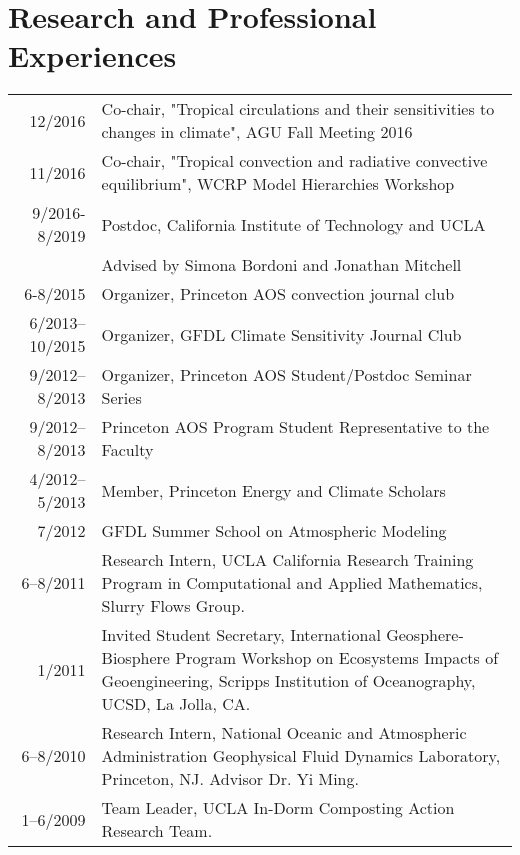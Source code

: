 \documentclass{article}
\begin{document}
\section*{Research and Professional Experiences}
\label{sec:orgheadline13}
\begin{center}
\begin{tabularx}{\textwidth}{rX}
12/2016 & Co-chair, "Tropical circulations and their sensitivities to changes in climate", AGU Fall Meeting 2016\\
11/2016 & Co-chair, "Tropical convection and radiative convective equilibrium", WCRP Model Hierarchies Workshop\\
9/2016-8/2019 & Postdoc, California Institute of Technology and UCLA\\
 & Advised by Simona Bordoni and Jonathan Mitchell\\
6-8/2015 & Organizer, Princeton AOS convection journal club\\
6/2013–10/2015 & Organizer, GFDL Climate Sensitivity Journal Club\\
9/2012–8/2013 & Organizer, Princeton AOS Student/Postdoc Seminar Series\\
9/2012–8/2013 & Princeton AOS Program Student Representative to the Faculty\\
4/2012–5/2013 & Member, Princeton Energy and Climate Scholars\\
7/2012 & GFDL Summer School on Atmospheric Modeling\\
6–8/2011 & Research Intern, UCLA California Research Training Program in Computational and Applied Mathematics, Slurry Flows Group.\\
1/2011 & Invited Student Secretary, International Geosphere-Biosphere Program Workshop on Ecosystems Impacts of Geoengineering, Scripps Institution of Oceanography, UCSD, La Jolla, CA.\\
6–8/2010 & Research Intern, National Oceanic and Atmospheric Administration Geophysical Fluid Dynamics Laboratory, Princeton, NJ. Advisor Dr. Yi Ming.\\
1–6/2009 & Team Leader, UCLA In-Dorm Composting Action Research Team.\\
\end{tabularx}
\end{center}
\end{document}
